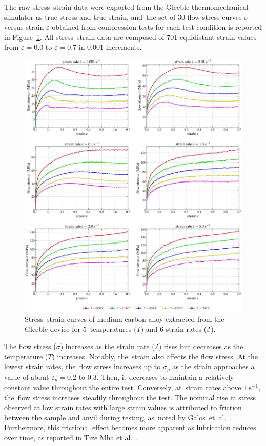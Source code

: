 \documentclass[metals,article,accept,pdftex,moreauthors]{Definitions/mdpi}
\makeatletter
\DeclareRobustCommand{\mdot}[1]{\accentset{\mbox{\bfseries .}}{#1}}
\DeclareRobustCommand{\eal}{et al.\@\xspace}
\DeclareRobustCommand{\ps}{\text{s}^{-1}}
\makeatother
\begin{document}
The raw stress--strain data were exported from the Gleeble thermomechanical simulator as true stress and true strain, and~the set of 30 flow stress curves $\sigma$ versus strain $\varepsilon$ obtained from compression tests for each test condition is reported in Figure~\ref{fig:RawData}.
All stress--strain data are composed of 701 equidistant strain values from $\varepsilon=0.0$ to $\varepsilon=0.7$ in $0.001$ increments.
\begin{figure}[H]
\centering
\includegraphics[width=0.9\columnwidth]{Figures/rawData}
\caption{Stress--strain curves of medium-carbon alloy extracted from the Gleeble device for \mbox{5 temperatures} ($T$) and 6 strain rates ($\mdot\varepsilon$).}
\label{fig:RawData}
\end{figure}

The flow stress ($\sigma$) increases as the strain rate ($\mdot\varepsilon$) rises but decreases as the temperature ($T$) increases.
Notably, the~strain also affects the flow stress.
At the lowest strain rates, the~flow stress increases up to $\sigma_p$ as the strain approaches a value of about $\varepsilon_p=0.2$ to $0.3$.
Then, it decreases to maintain a relatively constant value throughout the entire test.
Conversely, at~strain rates above $1~\ps$, the~flow stress increases steadily throughout the test.
The nominal rise in stress observed at low strain rates with large strain values is attributed to friction between the sample and anvil during testing, as~noted by \mbox{Galos \eal~\cite{Galos-2022}}.
\linebreak Furthermore, this frictional effect becomes more apparent as lubrication reduces over time, as reported in Tize Mha \eal~\cite{TizeMha-2023}.
\end{document}
